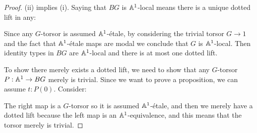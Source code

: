 \begin{proof}
  (ii) implies (i). Saying that $BG$ is $\mathbb{A}^1$-local means there is a unique dotted lift in any:
        \begin{center}
  \end{center}
Since any $G$-torsor is assumed $\mathbb{A}^1$-étale, by considering the trivial torsor $G\to 1$ and the fact that $\mathbb{A}^1$-étale maps are modal we conclude that $G$ is $\mathbb{A}^1$-local. Then identity types in $BG$ are $\mathbb{A}^1$-local and there is at most one dotted lift.
 
 To show there merely exists a dotted lift, we need to show that any $G$-torsor $P:\mathbb{A}^1\to BG$ merely is trivial. Since we want to prove a proposition, we can assume $t:P(0)$. Consider:
    \begin{center}
  \end{center}
 The right map is a $G$-torsor so it is assumed $\mathbb{A}^1$-étale, and then we merely have a dotted lift because the left map is an $\mathbb{A}^1$-equivalence, and this means that the torsor merely is trivial.
 
\end{proof}
